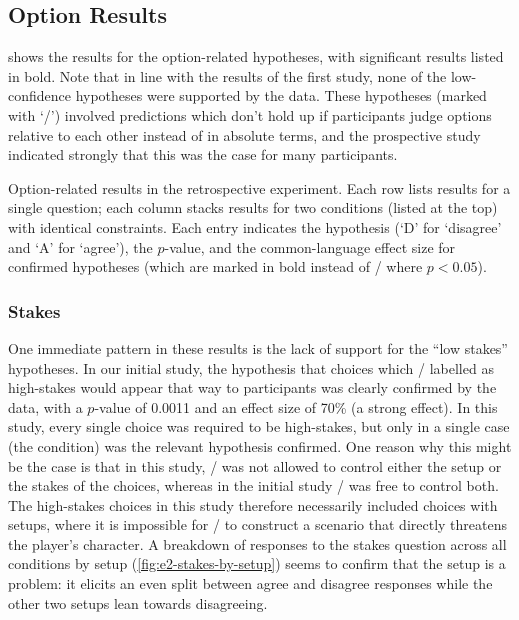 \subsection{Option Results}

 shows the results for the option-related hypotheses, with significant results listed in bold.
%
Note that in line with the results of the first study, none of the low-confidence hypotheses were supported by the data.
%
These hypotheses (marked with `\lc/') involved predictions which don't hold up if participants judge options relative to each other instead of in absolute terms, and the prospective study indicated strongly that this was the case for many participants.

\begin{table}[!t]
\centering
\bgroup
\def\arraystretch{1.3}
\setlength{\tabcolsep}{0.35em}

\egroup
\caption[Retrospective option results]{Option-related results in the retrospective experiment. Each row lists results for a single question; each column stacks results for two conditions (listed at the top) with identical  constraints. Each entry indicates the hypothesis (`D' for `disagree' and `A' for `agree'), the $p$-value, and the common-language effect size for confirmed hypotheses (which are marked in bold instead of \nsighcolor/ where $p < 0.05$).} %
  \label{tab:e2-option-results}
\end{table}


\subsubsection{Stakes}
One immediate pattern in these results is the lack of support for the ``low stakes'' hypotheses.
%
In our initial study, the hypothesis that choices which \dunyazad/ labelled as high-stakes would appear that way to participants was clearly confirmed by the data, with a $p$-value of 0.0011 and an effect size of 70\% (a strong effect).
%
In this study, every single choice was required to be high-stakes, but only in a single case (the \unxs{} condition) was the relevant hypothesis confirmed.
%
One reason why this might be the case is that in this study, \dunyazad/ was not allowed to control either the setup or the stakes of the choices, whereas in the initial study \dunyazad/ was free to control both.
%
The high-stakes choices in this study therefore necessarily included choices with  setups, where it is impossible for \dunyazad/ to construct a scenario that directly threatens the player's character.
%
A breakdown of responses to the stakes question across all conditions by setup (\cref{fig:e2-stakes-by-setup}) seems to confirm that the  setup is a problem: it elicits an even split between agree and disagree responses while the other two setups lean towards disagreeing.

